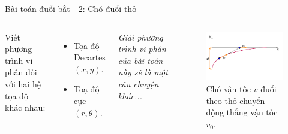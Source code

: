 \begin{frame}{Bài toán đuổi bắt - 2: Chó đuổi thỏ}
    \begin{columns}
            Viết phương trình vi phân đối với hai hệ tọa độ khác nhau:
            \begin{itemize}
                \item Tọa độ Decartes \( \left( x, y \right) \).
                \item Toạ độ cực \( \left( r, \theta \right) \). \cite{brebec2005cohoc1}
            \end{itemize}
        \vspace{5mm}
        \textit{Giải phương trình vi phân của bài toán này sẽ là một câu chuyện khác...}
        \vspace{-5mm}
        \begin{figure}
            \centering
            \includegraphics[width=0.9\linewidth]{Figures/Pursuit.pdf}
            \vspace{-2mm}
            \caption{Chó vận tốc \(v\) đuổi theo thỏ chuyển động thẳng vận tốc \(v_0\).}
            \label{fig:Pursuit}
        \end{figure}
    \end{columns}
\end{frame}

